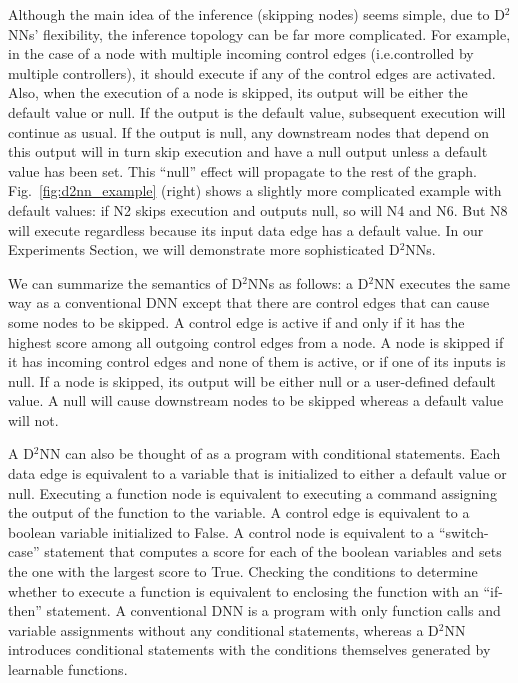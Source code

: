 \documentclass[10pt,twocolumn,letterpaper]{article}
\begin{document}
Although the main idea of the inference (skipping nodes) seems simple, due to D$^2$NNs' flexibility, the inference topology can
be far more complicated. For example, in the case of a
node with multiple incoming control edges (i.e.\@ controlled by multiple controllers), it
should execute if any of the control edges are activated. 
Also, when the execution of a node is skipped, its output will be either the default value or null. If the output is the default value, subsequent execution will
continue as usual. If the output is null, any
downstream nodes that depend on this output will in turn skip execution and have a null 
output unless a default value has been set. This ``null'' effect will propagate to the
rest of the graph. Fig.~\ref{fig:d2nn_example} (right) shows a slightly more complicated example with default values: if N2 skips execution and
outputs null, so will N4 and N6. But N8 will execute regardless because its input data edge has
a default value. In our Experiments Section, we will demonstrate more sophisticated D$^2$NNs.

We can summarize the semantics of D$^2$NNs as follows: a D$^2$NN executes the same way as a conventional
DNN except that there are control edges that can cause some nodes to be skipped. A control
edge is active if and only if it has the highest score among all outgoing control edges from a
node. A node is skipped if it has incoming control edges and none of them is
active, or if one of its inputs is null. If a node is skipped, its output will be either
null or a user-defined default value. A null will cause downstream nodes to be skipped whereas a default
value will not. 

A D$^2$NN can also be thought of as a program with conditional statements. Each data edge
is equivalent to a variable that is initialized to either a default value or null. Executing a function
node is equivalent to executing a command assigning the output of the function to the
variable. A control edge is equivalent to a boolean variable initialized to False. A
control node is equivalent to a ``switch-case'' statement that computes a score for each of
the boolean variables and sets the one with the largest score to True. Checking the
conditions to determine whether to execute a function is equivalent to enclosing the
function with an ``if-then'' statement. A conventional DNN is a program with
only function calls and variable assignments without any conditional statements, whereas a
D$^2$NN introduces conditional statements with the conditions themselves generated by
learnable functions. 
\end{document}
